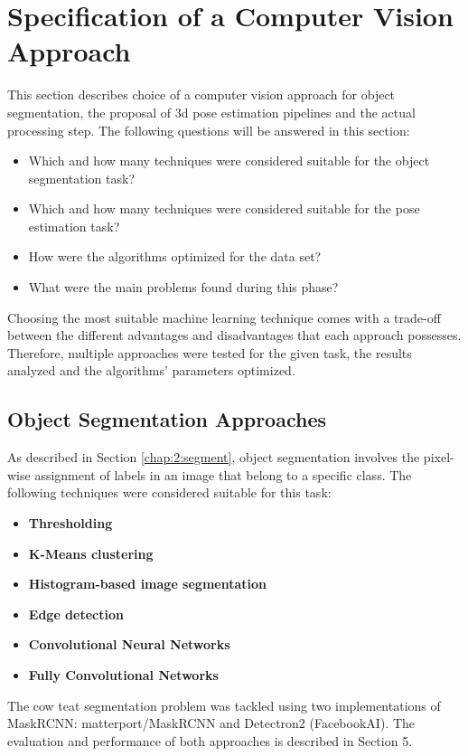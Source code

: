 \section{Specification of a Computer Vision Approach}\label{chap:3:method}
This section describes choice of a computer vision approach for object segmentation, the proposal of 3d pose estimation pipelines and the actual processing step. The following questions will be answered in this section:
\begin{itemize}
    \item Which and how many techniques were considered suitable for the object segmentation task?
    \item Which and how many techniques were considered suitable for the pose estimation task?
    \item How were the algorithms optimized for the data set?
    \item What were the main problems found during this phase?
\end{itemize}
Choosing the most suitable machine learning technique comes with a trade-off between the different advantages and disadvantages that each approach possesses. Therefore, multiple approaches were tested for the given task, the results analyzed and the algorithms’ parameters optimized. 

\subsection{Object Segmentation Approaches}
As described in Section \ref{chap:2:segment}, object segmentation involves the pixel-wise assignment of labels in an image that belong to a specific class. The following techniques were considered suitable for this task:
\begin{itemize}
    \item \textbf{Thresholding}
    \item \textbf{K-Means clustering}
    \item \textbf{Histogram-based image segmentation}
    \item \textbf{Edge detection}
    \item \textbf{Convolutional Neural Networks}
    \item \textbf{Fully Convolutional Networks}
\end{itemize}
The cow teat segmentation problem was tackled using two implementations of MaskRCNN: matterport/MaskRCNN and Detectron2 (FacebookAI). The evaluation and performance of both approaches is described in Section 5.

